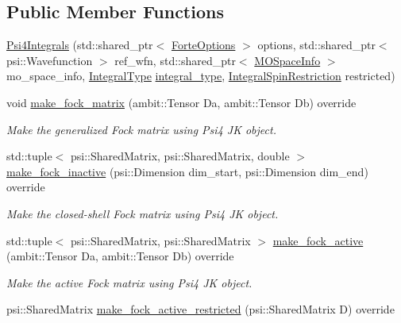 \subsection*{Public Member Functions}
\begin{DoxyCompactItemize}
\item 
\mbox{\hyperlink{classforte_1_1_psi4_integrals_a5c8007878380052c9128bd0ed78229b3}{Psi4\+Integrals}} (std\+::shared\+\_\+ptr$<$ \mbox{\hyperlink{classforte_1_1_forte_options}{Forte\+Options}} $>$ options, std\+::shared\+\_\+ptr$<$ psi\+::\+Wavefunction $>$ ref\+\_\+wfn, std\+::shared\+\_\+ptr$<$ \mbox{\hyperlink{classforte_1_1_m_o_space_info}{M\+O\+Space\+Info}} $>$ mo\+\_\+space\+\_\+info, \mbox{\hyperlink{namespaceforte_a790e7e85ac0911c4c9494622496d95e6}{Integral\+Type}} \mbox{\hyperlink{classforte_1_1_forte_integrals_af62c129aee5c995d15a95136a89faada}{integral\+\_\+type}}, \mbox{\hyperlink{namespaceforte_a7defa2660dd3eb07aa81176b90781be7}{Integral\+Spin\+Restriction}} restricted)
\item 
void \mbox{\hyperlink{classforte_1_1_psi4_integrals_abfd1e7a105ef05bfe50d175fbe766c36}{make\+\_\+fock\+\_\+matrix}} (ambit\+::\+Tensor Da, ambit\+::\+Tensor Db) override
\begin{DoxyCompactList}\small\item\em Make the generalized Fock matrix using Psi4 JK object. \end{DoxyCompactList}\item 
std\+::tuple$<$ psi\+::\+Shared\+Matrix, psi\+::\+Shared\+Matrix, double $>$ \mbox{\hyperlink{classforte_1_1_psi4_integrals_ac867cd8004611a1fe93c31f1068ad81c}{make\+\_\+fock\+\_\+inactive}} (psi\+::\+Dimension dim\+\_\+start, psi\+::\+Dimension dim\+\_\+end) override
\begin{DoxyCompactList}\small\item\em Make the closed-\/shell Fock matrix using Psi4 JK object. \end{DoxyCompactList}\item 
std\+::tuple$<$ psi\+::\+Shared\+Matrix, psi\+::\+Shared\+Matrix $>$ \mbox{\hyperlink{classforte_1_1_psi4_integrals_a0f33ab6a5df70095c58e662b6ebc3725}{make\+\_\+fock\+\_\+active}} (ambit\+::\+Tensor Da, ambit\+::\+Tensor Db) override
\begin{DoxyCompactList}\small\item\em Make the active Fock matrix using Psi4 JK object. \end{DoxyCompactList}\item 
psi\+::\+Shared\+Matrix \mbox{\hyperlink{classforte_1_1_psi4_integrals_a37dd630ef0a774d76aadcc73a920cd7f}{make\+\_\+fock\+\_\+active\+\_\+restricted}} (psi\+::\+Shared\+Matrix D) override

\end{DoxyCompactItemize}
